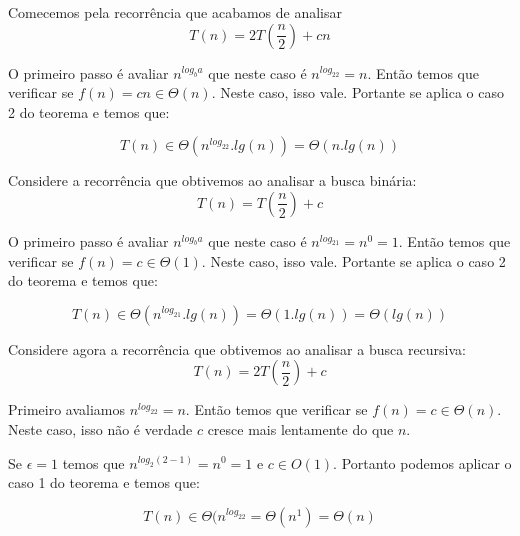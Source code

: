 \begin{example}
  Comecemos pela recorrência que acabamos de analisar
  \begin{displaymath}
    T(n) = 2T\left(\frac{n}{2}\right) + cn
  \end{displaymath}

  O primeiro passo é avaliar $n^{log_ba}$ que neste caso é $n^{log_22} = n$.
  Então temos que verificar se $f(n) = cn \in \Theta(n)$.
  Neste caso, isso vale.
  Portante se aplica o caso 2 do teorema e temos que:

  \begin{displaymath}
    T(n) \in \Theta(n^{log_22}.lg(n)) = \Theta(n.lg(n))
  \end{displaymath}
\end{example}

\begin{example}
  Considere a recorrência que obtivemos ao analisar a busca binária:
  \begin{displaymath}
    T(n) = T\left(\frac{n}{2}\right) + c
  \end{displaymath}

  O primeiro passo é avaliar $n^{log_ba}$ que neste caso é $n^{log_21} = n^0 = 1$.
  Então temos que verificar se $f(n) = c \in \Theta(1)$.
  Neste caso, isso vale.
  Portante se aplica o caso 2 do teorema e temos que:

  \begin{displaymath}
    T(n) \in \Theta(n^{log_21}.lg(n)) = \Theta(1.lg(n)) = \Theta(lg(n))
  \end{displaymath}
\end{example}


\begin{example}
  Considere agora a recorrência que obtivemos ao analisar a busca recursiva:
  \begin{displaymath}
    T(n) = 2T\left(\frac{n}{2}\right) + c
  \end{displaymath}

  Primeiro avaliamos $n^{log_22} = n$.
  Então temos que verificar se $f(n) = c \in \Theta(n)$.
  Neste caso, isso não é verdade $c$ cresce mais lentamente do que $n$.
  
  Se  $\epsilon = 1$ temos que $n^{log_2(2-1)} = n^0 = 1$ e $c \in O(1)$.
  Portanto podemos aplicar o caso 1 do teorema e temos que:

  \begin{displaymath}
    T(n) \in \Theta(n^{log_22} = \Theta(n^1) = \Theta(n)
  \end{displaymath}
\end{example}

